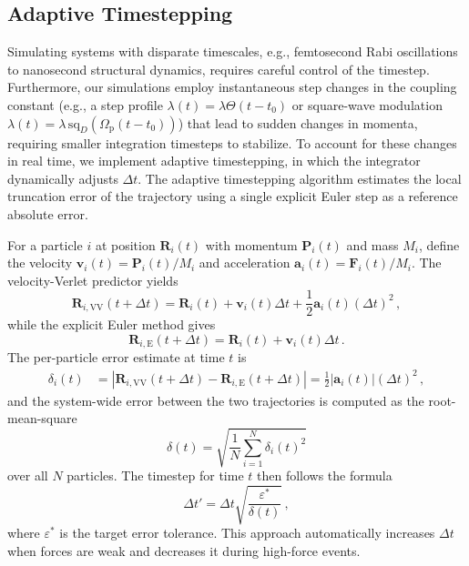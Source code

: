 \subsection{Adaptive Timestepping}

Simulating systems with disparate timescales, e.g., femtosecond Rabi oscillations to nanosecond structural dynamics, requires careful control of the timestep.
Furthermore, our simulations employ instantaneous step changes in the coupling constant (e.g., a step profile $\lambda(t) = \lambda \Theta(t-t_0)$ or square-wave modulation $\lambda(t) = \lambda\, \mathrm{sq}_D(\Omega_\mathrm{p}(t-t_0))$) that lead to sudden changes in momenta, requiring smaller integration timesteps to stabilize.
To account for these changes in real time, we implement adaptive timestepping, in which the integrator dynamically adjusts $\Delta t$. 
The adaptive timestepping algorithm estimates the local truncation error of the trajectory using a single explicit Euler step as a reference absolute error.

For a particle $i$ at position $\bm{R}_i(t)$ with momentum $\bm{P}_i(t)$ and mass $M_i$, define the velocity $\bm{v}_i(t) = \bm{P}_i(t)/M_i$ and acceleration $\bm{a}_i(t) = \bm{F}_i(t)/M_i$.
The velocity-Verlet predictor yields
\begin{equation}
\bm{R}_{i,\mathrm{VV}}(t + \Delta t) = \bm{R}_i(t) + \bm{v}_i(t) \Delta t + \frac{1}{2} \bm{a}_i(t) (\Delta t)^2 \,,
\end{equation}
while the explicit Euler method gives
\begin{equation}
\bm{R}_{i,\mathrm{E}}(t + \Delta t) = \bm{R}_i(t) + \bm{v}_i(t) \Delta t \,.
\end{equation}
The per-particle error estimate at time $t$ is
\begin{align}
\delta_i(t) &= \left| \bm{R}_{i,\mathrm{VV}}(t + \Delta t) - \bm{R}_{i,\mathrm{E}}(t + \Delta t) \right|  = \frac{1}{2} \left|\bm{a}_i(t)\right| (\Delta t)^2 \,,
\end{align}
and the system-wide error between the two trajectories is computed as the root-mean-square
\begin{equation}
\delta (t) = \sqrt{\frac{1}{N} \sum_{i=1}^{N} \delta_i(t)^2}
\end{equation}
over all $N$ particles. The timestep for time $t$ then follows the formula
\begin{equation}
\Delta t' = \Delta t \sqrt{\frac{\varepsilon^*}{\delta(t)}} \,,
\end{equation}
where $\varepsilon^*$ is the target error tolerance. This approach automatically increases $\Delta t$ when forces are weak and decreases it during high-force events.

